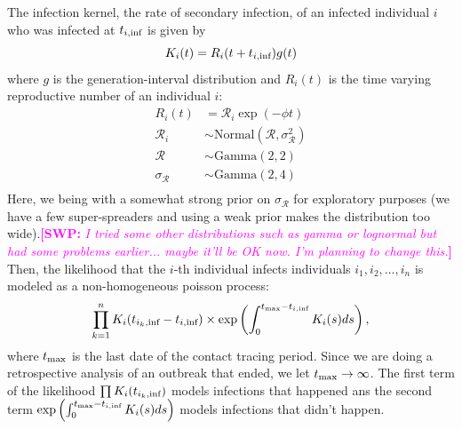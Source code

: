 \documentclass[12pt]{article}
\newcommand{\comment}[3]{\textcolor{#1}{\textbf{[#2: }\textsl{#3}\textbf{]}}}
\newcommand{\swp}[1]{\comment{magenta}{SWP}{#1}}
\begin{document}
The infection kernel, the rate of secondary infection, of an infected individual $i$ who was infected at $t_{i, \tiny{\textrm{inf}}}$ is given by 
\begin{equation}
K_i(t) = R_i(t + t_{i, \tiny{\textrm{inf}}}) g(t)
\end{equation}
where $g$ is the generation-interval distribution and $R_i(t)$ is the time varying reproductive number of an individual $i$:
\begin{equation}
\begin{aligned}
R_i(t) &= \mathcal R_i \exp(- \phi t)\\
\mathcal R_i &\sim \mathrm{Normal}(\mathcal R, \sigma_{\mathcal R}^2)\\
\mathcal R &\sim \mathrm{Gamma}(2, 2)\\
\sigma_{\mathcal R} &\sim \mathrm{Gamma}(2, 4)\\
\end{aligned}
\end{equation}
Here, we being with a somewhat strong prior on $\sigma_{\mathcal R}$ for exploratory purposes (we have a few super-spreaders and using a weak prior makes the distribution too wide).\swp{I tried some other distributions such as gamma or lognormal but had some problems earlier... maybe it'll be OK now. I'm planning to change this.}
Then, the likelihood that the $i$-th individual infects individuals $i_1, i_2, \dots, i_n$ is modeled as a non-homogeneous poisson process:
\begin{equation}
\prod_{k=1}^n K_i(t_{i_k, \tiny{\textrm{inf}}} - t_{i, \tiny{\textrm{inf}}}) \times \exp \left(\int_0^{t_{\tiny\textrm{max}} - t_{i, \tiny{\textrm{inf}}}} K_i (s) ds\right),
\end{equation}
where $t_{\tiny\textrm{max}}$ is the last date of the contact tracing period. 
Since we are doing a retrospective analysis of an outbreak that ended, we let $t_{\tiny\textrm{max}} \to \infty$.
The first term of the likelihood $\prod K_i(t_{i_k, \tiny{\textrm{inf}}})$ models infections that happened ans the second term $\exp \left(\int_0^{t_{\tiny\textrm{max}} - t_{i, \tiny{\textrm{inf}}}} K_i (s) ds\right)$ models infections that didn't happen.
\end{document}
